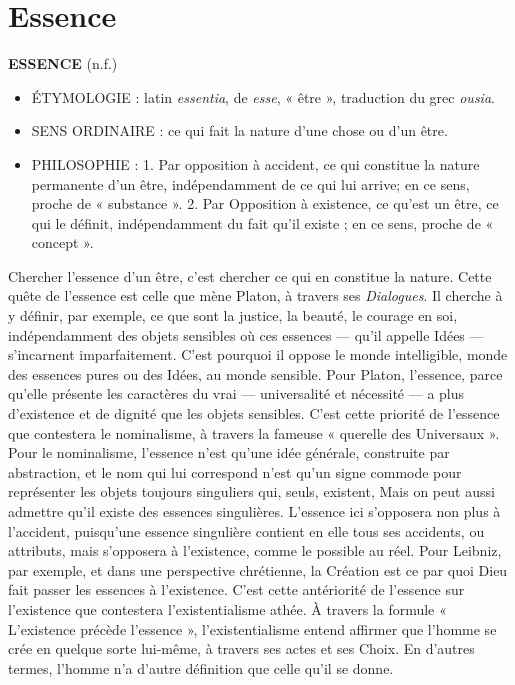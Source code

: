 
\chapter{Essence}

{\bf E{\footnotesize SSENCE}} (n.f.)

\begin{itemize}[leftmargin=1cm, label=, itemsep=1pt]
\item {\footnotesize ÉTYMOLOGIE} : latin {\it essentia}, de
{\it esse}, « être », traduction du grec {\it ousia}.
\item {\footnotesize SENS ORDINAIRE} : ce qui fait
la nature d’une chose ou d’un être.
\item {\footnotesize PHILOSOPHIE} : 1. Par opposition à
accident, ce qui constitue la nature
permanente d’un être, indépendamment de ce qui lui arrive; en ce
sens, proche de « substance ». 2. Par
Opposition à existence, ce qu'est un
être, ce qui le définit, indépendamment du fait qu'il existe ; en ce sens,
proche de « concept ».
\end{itemize}

Chercher l'essence d'un être, c’est chercher ce qui en constitue la nature. Cette
quête de l'essence est celle que mène
Platon, à travers ses {\it Dialogues}. Il
cherche à y définir, par exemple, ce que
sont la justice, la beauté, le courage en
soi, indépendamment des objets sensibles où ces essences — qu'il appelle
Idées — s'incarnent imparfaitement.
C’est pourquoi il oppose le monde intelligible, monde des essences pures ou
des Idées, au monde sensible. Pour Platon, l'essence, parce qu'elle présente les
caractères du vrai — universalité et
nécessité — a plus d'existence et de
dignité que les objets sensibles. C'est
cette priorité de l'essence que contestera
le nominalisme, à travers la fameuse
« querelle des Universaux ». Pour le
nominalisme, l'essence n’est qu’une idée
générale, construite par abstraction, et le
nom qui lui correspond n'est qu'un
signe commode pour représenter les
objets toujours singuliers qui, seuls,
existent, Mais on peut aussi admettre
qu'il existe des essences singulières.
L'essence ici s'opposera non plus à
l'accident, puisqu'une essence singulière contient en elle tous ses accidents,
ou attributs, mais s'opposera à l'existence, comme le possible au réel. Pour
Leibniz, par exemple, et dans une perspective chrétienne, la Création est ce
par quoi Dieu fait passer les essences à
l'existence. C'est cette antériorité de
l'essence sur l'existence que contestera
l’existentialisme athée. À travers la formule « L'existence précède l'essence »,
l'existentialisme entend affirmer que
l'homme se crée en quelque sorte lui-même, à travers ses actes et ses Choix.
En d’autres termes, l'homme n'a d'autre
définition que celle qu'il se donne.

